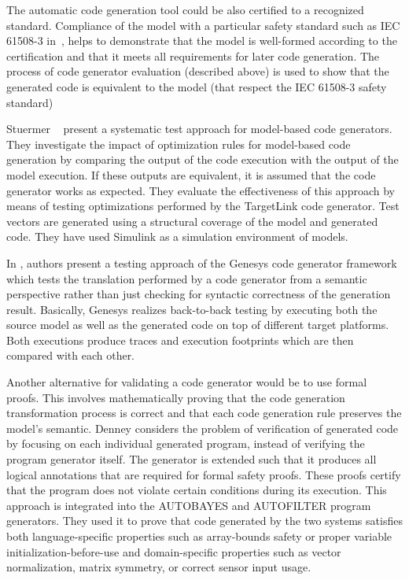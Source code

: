 The automatic code generation tool could be also certified to a recognized standard. Compliance of the model with a particular safety standard such as IEC 61508-3 in~\cite{conrad2009testing}, helps to demonstrate that the model is well-formed according to the certification and that it meets all requirements for later code generation. The process of code generator evaluation (described above) is used to show that the generated code is equivalent to the model (that respect the IEC 61508-3 safety standard)

Stuermer \etal~\cite{stuermer2007systematic} present a systematic test approach for model-based code generators. They investigate the impact of optimization rules for model-based code generation by comparing the output of the code execution with the output of the model execution. 
If these outputs are equivalent, it is assumed that the code generator works as expected. 
They evaluate the effectiveness of this approach by means of testing optimizations performed by the TargetLink code generator. Test vectors are generated using a structural coverage of the model and generated code.
They have used Simulink as a simulation environment of models. 

In \cite{jorges2014back}, authors present a testing approach of the Genesys code generator framework which tests the translation performed by a code generator from a semantic perspective rather than just checking for syntactic correctness of the generation result. Basically,
Genesys realizes back-to-back testing by executing both the source model as well as the generated code on top of different target platforms. Both executions produce traces and execution footprints which are then compared with each other.

Another alternative for validating a code generator would be to use formal proofs\cite{basir2008constructing}. This involves mathematically proving that the code generation transformation process is correct and that each code generation rule preserves the model's semantic. 
Denney \etal\cite{denney2005certifiable} considers the problem of verification of generated code by focusing on each individual generated program, instead of verifying the program generator itself.
The generator is extended such that it produces all logical annotations that are
required for formal safety proofs. These proofs certify that the program does not violate certain conditions during its execution. This approach is integrated into the AUTOBAYES and
AUTOFILTER program generators. They used it to prove that code generated by the two systems satisfies both language-specific properties such as array-bounds safety or proper variable initialization-before-use and domain-specific properties such as vector normalization, matrix symmetry, or correct sensor input usage.

